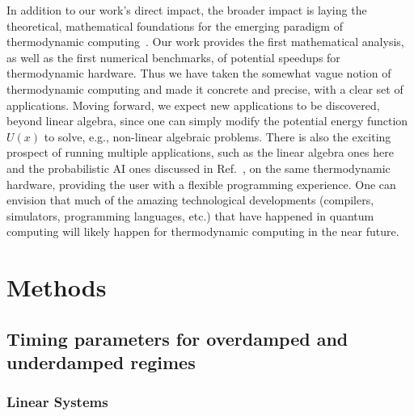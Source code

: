 \documentclass[prx,onecolumn,floatfix,longbibliography,notitlepage, nofootinbib]{revtex4-1}
\begin{document}
In addition to our work's direct impact, the broader impact is laying the theoretical, mathematical foundations for the emerging paradigm of thermodynamic computing~\cite{conte2019thermodynamic}. Our work provides the first mathematical analysis, as well as the first numerical benchmarks, of potential speedups for thermodynamic hardware. Thus we have taken the somewhat vague notion of thermodynamic computing and made it concrete and precise, with a clear set of applications. Moving forward, we expect new applications to be discovered, beyond linear algebra, since one can simply modify the potential energy function $U(x)$ to solve, e.g., non-linear algebraic problems. There is also the exciting prospect of running multiple applications, such as the linear algebra ones here and the probabilistic AI ones discussed in Ref.~\cite{coles2023thermodynamic}, on the same thermodynamic hardware, providing the user with a flexible programming experience. One can envision that much of the amazing technological developments (compilers, simulators, programming languages, etc.) that have happened in quantum computing will likely happen for thermodynamic computing in the near future.











\section{Methods}

\subsection{Timing parameters for overdamped and underdamped regimes}

\subsubsection{Linear Systems}
\end{document}
